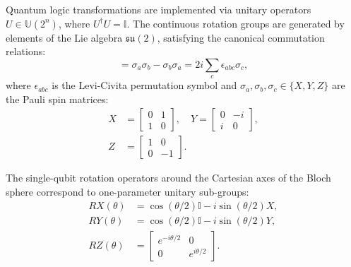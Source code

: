 \documentclass[journal]{IEEEtran}
\begin{document}
Quantum logic transformations are implemented via unitary operators $U \in \mathbb{U}(2^n)$, where $U^\dagger U = \mathbb{I}$. The continuous rotation groups are generated by elements of the Lie algebra $\mathfrak{su}(2)$, satisfying the canonical commutation relations:
\begin{equation}
[\sigma_a, \sigma_b] = \sigma_a \sigma_b - \sigma_b \sigma_a = 2i \sum_{c} \epsilon_{abc} \sigma_c,
\label{eq:lie_commutation}
\end{equation}
where $\epsilon_{abc}$ is the Levi-Civita permutation symbol and $\sigma_a, \sigma_b, \sigma_c \in \{X, Y, Z\}$ are the Pauli spin matrices:
\begin{align}
X &= \begin{bmatrix} 0 & 1 \\ 1 & 0 \end{bmatrix}, \quad Y = \begin{bmatrix} 0 & -i \\ i & 0 \end{bmatrix}, \nonumber \\
Z &= \begin{bmatrix} 1 & 0 \\ 0 & -1 \end{bmatrix}.
\label{eq:pauli_matrices}
\end{align}

The single-qubit rotation operators around the Cartesian axes of the Bloch sphere correspond to one-parameter unitary sub-groups:
\begin{align}
RX(\theta) &= \cos(\theta/2) \mathbb{I} - i \sin(\theta/2) X, \label{eq:rx_gate} \\
RY(\theta) &= \cos(\theta/2) \mathbb{I} - i \sin(\theta/2) Y, \label{eq:ry_gate} \\
RZ(\theta) &= \begin{bmatrix} e^{-i\theta/2} & 0 \\ 0 & e^{i\theta/2} \end{bmatrix}. \label{eq:rz_gate}
\end{align}
\end{document}
